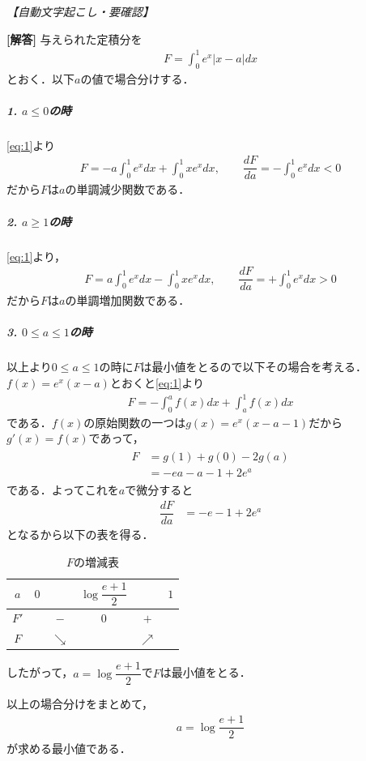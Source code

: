 \documentclass[../../main.tex]{subfiles}
\begin{document}
\begin{oframed}
  
\end{oframed}

\begin{flushright}
  \footnotesize\textit{【自動文字起こし・要確認】}
\end{flushright}

{\bf [解答]}
与えられた定積分を
\begin{align}
  F=\int_0^1e^x|x-a|dx \label{eq:1}
\end{align}
とおく．以下$a$の値で場合分けする．

\subparagraph{1. $a\le 0$の時}
\cref{eq:1}より
\begin{align}
  F=-a\int_0^1e^xdx+\int_0^1xe^xdx, \qquad \dfrac{dF}{da}=-\int_0^1e^xdx <0
\end{align}
だから$F$は$a$の単調減少関数である．

\subparagraph{2. $a\ge 1$の時}
\cref{eq:1}より，
\begin{align}
  F=a\int_0^1e^xdx-\int_0^1xe^xdx, \qquad \dfrac{dF}{da}=+\int_0^1e^xdx >0
\end{align}
だから$F$は$a$の単調増加関数である．

\subparagraph{3. $0 \le a\le 1$の時}
以上より$0\le a\le1$の時に$F$は最小値をとるので以下その場合を考える．
$f(x)=e^x(x-a)$とおくと\cref{eq:1}より
\begin{align}
  F=-\int_0^af(x)dx+\int_a^1f(x)dx
\end{align}
である．$f(x)$の原始関数の一つは$g(x)=e^x(x-a-1)$だから$g'(x)=f(x)$であって，
\begin{align}
  \begin{split}
    F
    &=g(1)+g(0)-2g(a) \\
    &=-ea-a-1+2e^a
  \end{split}
\end{align}
である．よってこれを$a$で微分すると
\begin{align}
  \dfrac{dF}{da}&=-e-1+2e^a
\end{align}
となるから以下の表を得る．

\begin{table}[htb]
  \centering
  \caption{$F$の増減表}
  \begin{tabular}{c|ccccc}
    $a$ & $0$ & & $\log\dfrac{e+1}{2}$ & & $1$ \\
    \hline
    $F'$ & & $-$ & $0$ & $+$ & \\
    \hline
    $F$ & & $\searrow$ & & $\nearrow$ &
  \end{tabular}
\end{table}
したがって，$a=\log\dfrac{e+1}{2}$で$F$は最小値をとる．
\casesend

以上の場合分けをまとめて，
\begin{align}
  a=\log\dfrac{e+1}{2}
\end{align}
が求める最小値である．

\newpage
\end{document}
